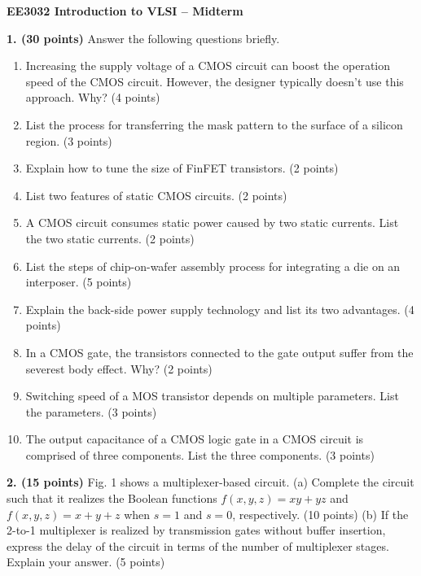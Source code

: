 \documentclass[10pt]{article}
\begin{document}
\begin{center}{\large\bfseries EE3032 Introduction to VLSI -- Midterm}\end{center}
\textbf{1. (30 points)} Answer the following questions briefly.
\begin{enumerate}[label=(\alph*),leftmargin=7mm,itemsep=2pt,topsep=2pt]
\item Increasing the supply voltage of a CMOS circuit can boost the operation speed of the CMOS circuit. However, the designer typically doesn't use this approach. Why? (4 points)
\item List the process for transferring the mask pattern to the surface of a silicon region. (3 points)
\item Explain how to tune the size of FinFET transistors. (2 points)
\item List two features of static CMOS circuits. (2 points)
\item A CMOS circuit consumes static power caused by two static currents. List the two static currents. (2 points)
\item List the steps of chip-on-wafer assembly process for integrating a die on an interposer. (5 points)
\item Explain the back-side power supply technology and list its two advantages. (4 points)
\item In a CMOS gate, the transistors connected to the gate output suffer from the severest body effect. Why? (2 points)
\item Switching speed of a MOS transistor depends on multiple parameters. List the parameters. (3 points)
\item The output capacitance of a CMOS logic gate in a CMOS circuit is comprised of three components. List the three components. (3 points)
\end{enumerate}
\textbf{2. (15 points)} Fig. 1 shows a multiplexer-based circuit. (a) Complete the circuit such that it realizes the Boolean functions $f(x,y,z)=xy+yz$ and $f(x,y,z)=x+y+z$ when $s=1$ and $s=0$, respectively. (10 points) (b) If the 2-to-1 multiplexer is realized by transmission gates without buffer insertion, express the delay of the circuit in terms of the number of multiplexer stages. Explain your answer. (5 points)
\end{document}
